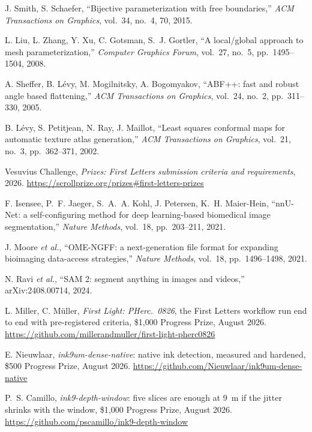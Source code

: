  J. Smith, S. Schaefer, ``Bijective parameterization with free
  boundaries,'' \emph{ACM Transactions on Graphics}, vol.~34, no.~4, 70, 2015.

 L. Liu, L. Zhang, Y. Xu, C. Gotsman, S.~J. Gortler, ``A local/global
  approach to mesh parameterization,'' \emph{Computer Graphics Forum}, vol.~27, no.~5,
  pp.~1495--1504, 2008.

 A. Sheffer, B. L\'evy, M. Mogilnitsky, A. Bogomyakov, ``ABF++: fast and
  robust angle based flattening,'' \emph{ACM Transactions on Graphics}, vol.~24, no.~2,
  pp.~311--330, 2005.

 B. L\'evy, S. Petitjean, N. Ray, J. Maillot, ``Least squares conformal maps
  for automatic texture atlas generation,'' \emph{ACM Transactions on Graphics}, vol.~21,
  no.~3, pp.~362--371, 2002.

 Vesuvius Challenge, \emph{Prizes: First Letters submission criteria and
  requirements}, 2026. \url{https://scrollprize.org/prizes\#first-letters-prizes}


 F. Isensee, P.~F. Jaeger, S.~A.~A. Kohl, J. Petersen, K.~H. Maier-Hein,
  ``nnU-Net: a self-configuring method for deep learning-based biomedical image
  segmentation,'' \emph{Nature Methods}, vol.~18, pp.~203--211, 2021.

 J. Moore \emph{et al.}, ``OME-NGFF: a next-generation file format for
  expanding bioimaging data-access strategies,'' \emph{Nature Methods}, vol.~18,
  pp.~1496--1498, 2021.

 N. Ravi \emph{et al.}, ``SAM 2: segment anything in images and videos,''
  arXiv:2408.00714, 2024.

 L. Miller, C. M\"uller, \emph{First Light: PHerc.\ 0826}, the First
  Letters workflow run end to end with pre-registered criteria, \$1{,}000 Progress Prize,
  August 2026. \url{https://github.com/millerandmuller/first-light-pherc0826}

 E. Nieuwlaar, \emph{ink9um-dense-native}: native ink detection,
  measured and hardened, \$500 Progress Prize, August 2026.
  \url{https://github.com/Nieuwlaar/ink9um-dense-native}

 P.~S. Camillo, \emph{ink9-depth-window}: five slices are enough at
  9~\textmu m if the jitter shrinks with the window, \$1{,}000 Progress Prize, August 2026.
  \url{https://github.com/pscamillo/ink9-depth-window}

